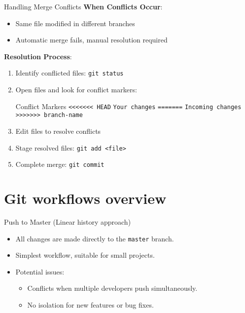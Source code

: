 \documentclass{beamer}
\begin{document}
\begin{frame}{Handling Merge Conflicts}
  \textbf{When Conflicts Occur}:
  \begin{itemize}
    \item Same file modified in different branches
    \item Automatic merge fails, manual resolution required
  \end{itemize}
  
  \textbf{Resolution Process}:
  \begin{enumerate}
    \item Identify conflicted files: \texttt{git status}
    \item Open files and look for conflict markers:
    \begin{block}{Conflict Markers}
      \texttt{<<<<<<< HEAD}\newline
      \texttt{Your changes}\newline
      \texttt{=======}\newline
      \texttt{Incoming changes}\newline
      \texttt{>>>>>>> branch-name}
    \end{block}
    \item Edit files to resolve conflicts
    \item Stage resolved files: \texttt{git add <file>}
    \item Complete merge: \texttt{git commit}
  \end{enumerate}
\end{frame}

\section{Git workflows overview}

\begin{frame}{Push to Master (Linear history approach)}
  \begin{itemize}
      \item All changes are made directly to the \texttt{master} branch.
      \item Simplest workflow, suitable for small projects.
      \item Potential issues:
      \begin{itemize}
          \item Conflicts when multiple developers push simultaneously.
          \item No isolation for new features or bug fixes.
      \end{itemize}
  \end{itemize}
\end{frame}
\end{document}
